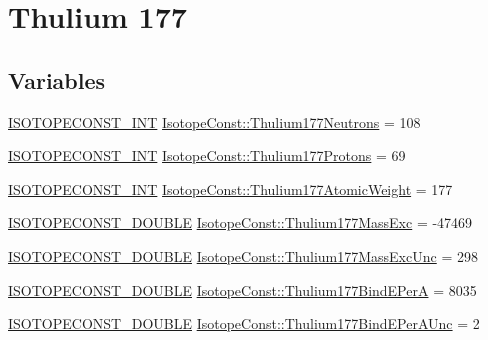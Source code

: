 \hypertarget{group___isotope_const-_thulium-_tm177}{}\section{Thulium 177}
\label{group___isotope_const-_thulium-_tm177}
\subsection*{Variables}
\begin{DoxyCompactItemize}
\item 
\mbox{\hyperlink{group___isotope_const-_macros_ga5f18360b3e99483a35c32d789e62621c}{I\+S\+O\+T\+O\+P\+E\+C\+O\+N\+S\+T\+\_\+\+I\+NT}} \mbox{\hyperlink{group___isotope_const-_thulium-_tm177_ga012a277619746be9edf9de7f8a7f29fe}{Isotope\+Const\+::\+Thulium177\+Neutrons}} = 108
\item 
\mbox{\hyperlink{group___isotope_const-_macros_ga5f18360b3e99483a35c32d789e62621c}{I\+S\+O\+T\+O\+P\+E\+C\+O\+N\+S\+T\+\_\+\+I\+NT}} \mbox{\hyperlink{group___isotope_const-_thulium-_tm177_gada5a37170daa9c90e4cee6c815641ecb}{Isotope\+Const\+::\+Thulium177\+Protons}} = 69
\item 
\mbox{\hyperlink{group___isotope_const-_macros_ga5f18360b3e99483a35c32d789e62621c}{I\+S\+O\+T\+O\+P\+E\+C\+O\+N\+S\+T\+\_\+\+I\+NT}} \mbox{\hyperlink{group___isotope_const-_thulium-_tm177_gab28f3a753b3fb1e0c1f465c4dab7c9b6}{Isotope\+Const\+::\+Thulium177\+Atomic\+Weight}} = 177
\item 
\mbox{\hyperlink{group___isotope_const-_macros_ga8f45a7272ce02c0b4c65c44636ed719a}{I\+S\+O\+T\+O\+P\+E\+C\+O\+N\+S\+T\+\_\+\+D\+O\+U\+B\+LE}} \mbox{\hyperlink{group___isotope_const-_thulium-_tm177_gac46b2a813a53e58c1bb5c66e553685a5}{Isotope\+Const\+::\+Thulium177\+Mass\+Exc}} = -\/47469
\item 
\mbox{\hyperlink{group___isotope_const-_macros_ga8f45a7272ce02c0b4c65c44636ed719a}{I\+S\+O\+T\+O\+P\+E\+C\+O\+N\+S\+T\+\_\+\+D\+O\+U\+B\+LE}} \mbox{\hyperlink{group___isotope_const-_thulium-_tm177_gac51cffb1e293d59e721651dbd629c320}{Isotope\+Const\+::\+Thulium177\+Mass\+Exc\+Unc}} = 298
\item 
\mbox{\hyperlink{group___isotope_const-_macros_ga8f45a7272ce02c0b4c65c44636ed719a}{I\+S\+O\+T\+O\+P\+E\+C\+O\+N\+S\+T\+\_\+\+D\+O\+U\+B\+LE}} \mbox{\hyperlink{group___isotope_const-_thulium-_tm177_ga711377f2165b38c971437aaaed4df1df}{Isotope\+Const\+::\+Thulium177\+Bind\+E\+PerA}} = 8035
\item 
\mbox{\hyperlink{group___isotope_const-_macros_ga8f45a7272ce02c0b4c65c44636ed719a}{I\+S\+O\+T\+O\+P\+E\+C\+O\+N\+S\+T\+\_\+\+D\+O\+U\+B\+LE}} \mbox{\hyperlink{group___isotope_const-_thulium-_tm177_ga75b636468e6ed24fe4cdab0009813375}{Isotope\+Const\+::\+Thulium177\+Bind\+E\+Per\+A\+Unc}} = 2

\end{DoxyCompactItemize}
